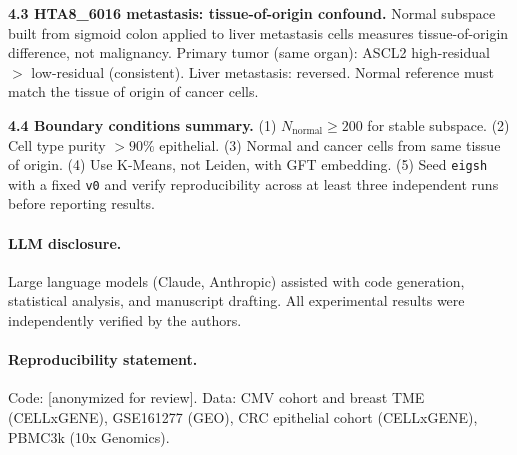 \documentclass{article}
\begin{document}
\textbf{4.3 HTA8\_6016 metastasis: tissue-of-origin confound.} Normal subspace built from sigmoid colon applied to liver metastasis cells measures tissue-of-origin difference, not malignancy. Primary tumor (same organ): ASCL2 high-residual $>$ low-residual (consistent). Liver metastasis: reversed. Normal reference must match the tissue of origin of cancer cells.

\textbf{4.4 Boundary conditions summary.} (1) $N_\text{normal} \geq 200$ for stable subspace. (2) Cell type purity $>90\%$ epithelial. (3) Normal and cancer cells from same tissue of origin. (4) Use K-Means, not Leiden, with GFT embedding. (5) Seed \texttt{eigsh} with a fixed \texttt{v0} and verify reproducibility across at least three independent runs before reporting results.

\paragraph{LLM disclosure.} Large language models (Claude, Anthropic) assisted with code generation, statistical analysis, and manuscript drafting. All experimental results were independently verified by the authors.

\paragraph{Reproducibility statement.} Code: [anonymized for review]. Data: CMV cohort and breast TME (CELLxGENE), GSE161277 (GEO), CRC epithelial cohort (CELLxGENE), PBMC3k (10x Genomics).
\end{document}
